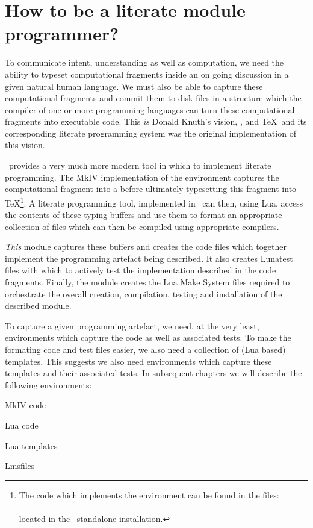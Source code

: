 \section{How to be a literate module programmer?} 

To communicate intent, understanding as well as computation, we need the 
ability to typeset computational fragments inside an on going discussion 
in a given natural human language. We must also be able to capture these 
computational fragments and commit them to disk files in a structure which 
the compiler of one or more programming languages can turn these 
computational fragments into executable code. This \emph{is} Donald 
Knuth's vision, \cite{knuth1984literateProgramming}, and \TeX\ and its 
corresponding  literate programming system was the original 
implementation of this vision. 

\ConTeXt\ provides a very much more modern tool in which to implement 
literate programming. The MkIV implementation of the  
environment captures the computational fragment into a  
before ultimately typesetting this fragment into \TeX\footnote{The code 
which implements the  environment can be found in the 
files:\\ 
\\ 
located in the \ConTeXt\ standalone installation.}. A literate programming 
tool, implemented in \ConTeXt\, can then, using Lua, access the contents 
of these typing buffers and use them to format an appropriate collection 
of files which can then be compiled using appropriate compilers. 

\emph{This}  module captures these buffers and 
creates the code files which together implement the programming artefact 
being described. It also creates Lunatest files with which to actively 
test the implementation described in the code fragments. Finally, the 
 module creates the Lua Make System files required 
to orchestrate the overall creation, compilation, testing and installation 
of the described module. 

To capture a given programming artefact, we need, at the very least, 
 environments which capture the code as well as associated 
tests. To make the formating code and test files easier, we also need a 
collection of (Lua based) templates. This suggests we also need 
 environments which capture these templates and their 
associated tests. In subsequent chapters we will describe the following 
environments:


\startitemize
  \item MkIV code
  \item Lua code
  \item Lua templates
  \item Lmsfiles
\stopitemize 

\stopchapter 

